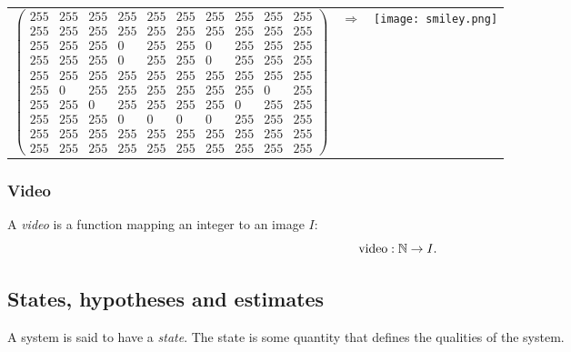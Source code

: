 \begin{example}~\\
    \begin{tabular}{lcr}
        $
        \begin{pmatrix} 
        255&  255&  255&  255&  255&  255&  255&  255&  255&  255\\
        255&  255&  255&  255&  255&  255&  255&  255&  255&  255\\
        255&  255&  255&    0&  255&  255&    0&  255&  255&  255\\
        255&  255&  255&    0&  255&  255&    0&  255&  255&  255\\
        255&  255&  255&  255&  255&  255&  255&  255&  255&  255\\
        255&    0&  255&  255&  255&  255&  255&  255&    0&  255\\
        255&  255&    0&  255&  255&  255&  255&    0&  255&  255\\
        255&  255&  255&    0&    0&    0&    0&  255&  255&  255\\
        255&  255&  255&  255&  255&  255&  255&  255&  255&  255\\
        255&  255&  255&  255&  255&  255&  255&  255&  255&  255
        \end{pmatrix}
       $
       &$\Rightarrow$& \parbox[c]{1em}{\texttt{[image: smiley.png]}}
    \end{tabular}
\end{example}

\subsubsection{Video}
A \emph{video} is a function mapping an integer to an image $I$:
\begin{equation}
    \text{video} : \mathbb{N} \rightarrow I.
\end{equation}

\subsection{States, hypotheses and estimates}
A system is said to have a \emph{state}. The state is some quantity that defines the qualities of the system.

